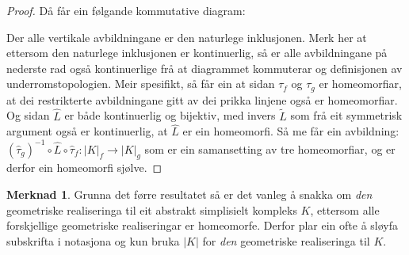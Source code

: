 \documentclass[a4paper, titlepage, 12pt, norsk]{article}
\theoremstyle{plain}
\theoremstyle{definition}
\newtheorem{remark}[theorem]{Merknad}
\newcommand{\Rb}{\mathbb{R}}
\newcommand{\gr}[1]{ \lvert #1 \rvert } %
\begin{document}
\begin{proof}
	Då får ein følgande kommutative diagram:
	\begin{center} %
	\end{center}
	Der alle vertikale avbildningane er den naturlege inklusjonen.
	Merk her at ettersom den naturlege inklusjonen er kontinuerlig, så er alle avbildningane på nederste rad også kontinuerlige frå at diagrammet kommuterar og definisjonen av underromstopologien. Meir spesifikt, så får ein at sidan $\tau_f$ og $\tau_g$ er homeomorfiar, at dei restrikterte avbildningane gitt av dei prikka linjene også er homeomorfiar.
	Og sidan $\hat{L}$ er både kontinuerlig og bijektiv, med invers $\tilde{L}$ som frå eit symmetrisk argument også er kontinuerlig, at $\hat{L}$ er ein homeomorfi.
	Så me får ein avbildning: $(\hat{\tau}_g)^{-1}\circ\hat{L}\circ\hat{\tau}_f:\gr{K}_f\to\gr{K}_g$ som er ein samansetting av tre homeomorfiar, og er derfor ein homeomorfi sjølve.
\end{proof}

\begin{remark}
	Grunna det førre resultatet så er det vanleg å snakka om \emph{den} geometriske realiseringa til eit abstrakt simplisielt kompleks $K$, ettersom alle forskjellige geometriske realiseringar er homeomorfe. Derfor plar ein ofte å sløyfa subskrifta i notasjona og kun bruka $\gr{K}$ for \emph{den} geometriske realiseringa til $K$.
\end{remark}
\end{document}
